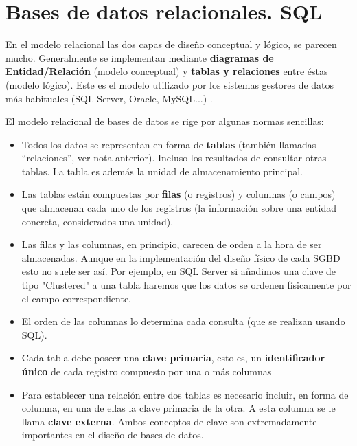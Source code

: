\section{Bases de datos relacionales. SQL}

En el modelo relacional las dos capas de diseño conceptual y lógico, se parecen mucho. Generalmente se implementan mediante \textbf{diagramas de Entidad/Relación} (modelo conceptual) y \textbf{tablas y relaciones} entre éstas (modelo lógico). Este es el modelo utilizado por los sistemas gestores de datos más habituales (SQL Server, Oracle, MySQL...) \cite{ref7}.

El modelo relacional de bases de datos se rige por algunas normas sencillas:

\begin{itemize}

\item Todos los datos se representan en forma de \textbf{tablas} (también llamadas “relaciones”, ver nota anterior). Incluso los resultados de consultar otras tablas. La tabla es además la unidad de almacenamiento principal.

\item Las tablas están compuestas por \textbf{filas} (o registros) y columnas (o campos) que almacenan cada uno de los registros (la información sobre una entidad concreta, considerados una unidad).

\item Las filas y las columnas, en principio, carecen de orden a la hora de ser almacenadas. Aunque en la implementación del diseño físico de cada SGBD esto no suele ser así. Por ejemplo, en SQL Server si añadimos una clave de tipo "Clustered" a una tabla haremos que los datos se ordenen físicamente por el campo correspondiente.

\item El orden de las columnas lo determina cada consulta (que se realizan usando SQL).

\item Cada tabla debe poseer una \textbf{clave primaria}, esto es, un \textbf{identificador único} de cada registro compuesto por una o más columnas

\item Para establecer una relación entre dos tablas es necesario incluir, en forma de columna, en una de ellas la clave primaria de la otra. A esta columna se le llama \textbf{clave externa}. Ambos conceptos de clave son extremadamente importantes en el diseño de bases de datos.

\end{itemize}

